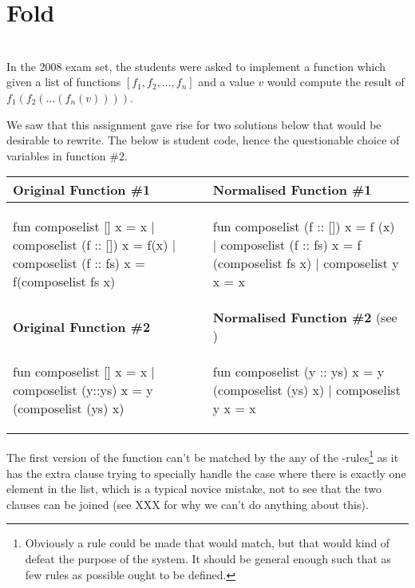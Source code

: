 \section{Fold}

\begin{example}[...]\
  \label{ex:fold-instance-composelist}\\
  In the 2008 exam set, the students were asked to implement a 
  function which given a list of functions $[f_1, f_2, \ldots, f_n]$ and a value
  $v$ would compute the result of $f_1(f_2(\ldots(f_n(v))))$.

  We saw that this assignment gave rise for two solutions below that would be
  desirable to rewrite. The below is student code, hence the questionable choice
  of variables in function \#2.

  \begin{center}
    \begin{tabular}{|l|l|}
      \hline
      \textbf{Original Function \#1}
      & 
      \textbf{Normalised Function \#1}
      \\\hline
\begin{sml}
fun composelist [] x = x 
  | composelist (f :: []) x = f(x) 
  | composelist (f :: fs) x = 
      f(composelist fs x)
\end{sml}
      &
\begin{sml}
fun composelist (f :: []) x = f (x)
  | composelist (f :: fs) x = 
      f (composelist fs x)
  | composelist y x = x        
\end{sml}
      \\\hline
      \textbf{Original Function \#2}
      &
      \textbf{Normalised Function \#2}
      \footnotesize{(see \fref{tr:trace-normalise-composelist})}
      \\\hline
\begin{sml}
fun composelist [] x = x 
  | composelist (y::ys) x = 
     y (composelist (ys) x)
\end{sml}
      &
\begin{sml}
fun composelist (y :: ys) x = 
      y (composelist (ys) x)
  | composelist y x = x
\end{sml}
      \\\hline
    \end{tabular}
  \end{center}

  \noindent
  The first version of the  function can't be matched by the
  any of the \tsf{fold}-rules\footnote{Obviously a rule could be made that would
    match, but that would kind of defeat the purpose of the system. It should be
    general enough such that as few rules as possible ought to be defined.} as
  it has the extra clause trying to specially handle the case where there is
  exactly one element in the list, which is a typical novice mistake, not to see
  that the two clauses can be joined (see XXX \fixme{ref to the unification} for
  why we can't do anything about this).


\end{example}
